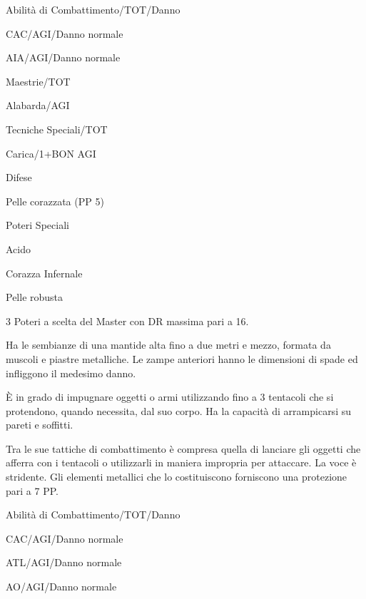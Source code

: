 
\begin{parmostro}{Abilit\`a di Combattimento/TOT/Danno} 
\item CAC/AGI/Danno normale 
\item AIA/AGI/Danno normale
\end{parmostro}

\begin{parmostro}{Maestrie/TOT} 
\item Alabarda/AGI
\end{parmostro}

\begin{parmostro}{Tecniche Speciali/TOT} 
\item Carica/1+BON AGI
\end{parmostro}

\begin{parmostro}{Difese} 
\item Pelle corazzata (PP 5)
\end{parmostro}

\begin{parmostro}{Poteri Speciali} 
\item Acido
\item Corazza Infernale
\item Pelle robusta
\item 3 Poteri a scelta del Master con DR massima pari a 16.
\end{parmostro}

 Ha le sembianze di
una mantide alta fino a due metri e mezzo, formata da muscoli e
piastre metalliche.  Le zampe anteriori hanno le dimensioni di spade
ed infliggono il medesimo danno.

\`E in grado di impugnare oggetti o armi utilizzando fino a 3
tentacoli che si protendono, quando necessita, dal suo corpo. Ha la
capacit\`a di arrampicarsi su pareti e soffitti.

Tra le sue tattiche di combattimento \`e compresa quella di lanciare
gli oggetti che afferra con i tentacoli o utilizzarli in maniera
impropria per attaccare. La voce \`e stridente. Gli elementi
metallici che lo costituiscono forniscono una protezione pari a 7 PP.


\begin{parmostro}{Abilit\`a di Combattimento/TOT/Danno} 
\item CAC/AGI/Danno normale
\item ATL/AGI/Danno normale
\item AO/AGI/Danno normale
\end{parmostro}

